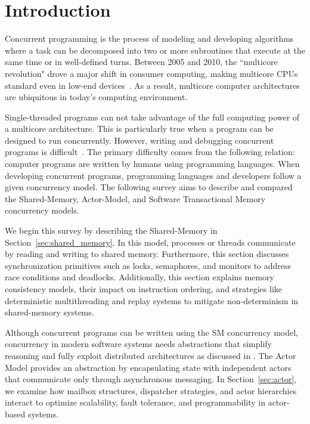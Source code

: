 \section{Introduction\label{sec:introduction}}
Concurrent programming is the process of modeling and
developing algorithms where a task can be decomposed into
two or more subroutines that execute at the same time or in well-defined turns.
Between 2005 and 2010, the ``multicore revolution" drove a major shift in consumer computing,
making multicore CPUs standard even in low-end devices~\cite{alseqyani2023history}.
As a result, multicore computer architectures are ubiquitous in today’s computing environment.

Single-threaded programs can not take advantage of the full computing power of a multicore architecture.
This is particularly true when a program can be designed to run concurrently.
However, writing and debugging concurrent programs is difficult~\cite{huang2016debuggingConcurrentPrograms}.
The primary difficulty comes from the following relation: computer programs
are written by humans using programming languages. 
When developing concurrent programs, programming languages and developers
follow a given concurrency model. The following survey aims to describe
and compared the Shared-Memory, Actor-Model, and Software Transactional Memory
concurrency models.

We begin this survey by describing the Shared-Memory
in Section~\ref{sec:shared_memory}.
In this model, processes or threads communicate by reading and writing
to shared memory.
Furthermore, this section discusses 
synchronization primitives such as locks, semaphores,
and monitors to address race conditions and deadlocks.
Additionally, this section explains memory consistency models,
their impact on instruction ordering,
and strategies like deterministic multithreading
and replay systems to mitigate
non-determinism in shared-memory systems.

Although concurrent programs can be written using the SM concurrency
model, concurrency in modern software systems needs abstractions
that simplify reasoning and fully exploit distributed
architectures as discussed in \cite{10.1145/357980.358021}.
The Actor Model provides an abstraction by encapsulating state
with independent actors that communicate only through
asynchronous messaging. In Section~\ref{sec:actor},
we examine how mailbox structures, dispatcher strategies,
and actor hierarchies interact to optimize scalability, fault tolerance,
and programmability in actor-based systems.
